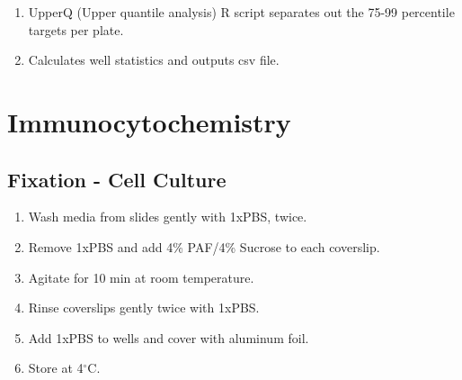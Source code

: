 \begin{enumerate}
\begin{figure}[!ht]
{    }
  \end{figure}
  \pagebreak
\item UpperQ (Upper quantile analysis) R script separates out the 75-99 percentile targets per plate.
  \begin{figure}[ht]
    \centering
  \end{figure}
\item Calculates well statistics and outputs csv file.
\end{enumerate}

\pagebreak

\section{Immunocytochemistry}

\subsection{Fixation - Cell Culture}
\begin{enumerate}
\item Wash media from slides gently with 1xPBS, twice.
\item Remove 1xPBS and add 4\% PAF/4\% Sucrose to each coverslip\footnotemark.
\item Agitate for 10 min at room temperature.
\item Rinse coverslips gently twice with 1xPBS.
\item Add 1xPBS to wells and cover with aluminum foil.
\item Store at 4$^{\circ}$C.
\end{enumerate}


